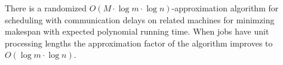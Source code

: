 \begin{theorem} \label{thm:colmain}
There is a randomized $O(M \cdot \log m \cdot \log n)$-approximation algorithm for 
scheduling with communication delays on related machines for minimzing makespan
with expected polynomial running time. When jobs have unit processing lengths the approximation factor of the algorithm improves to  $O(\log m \cdot \log n)$.
\end{theorem}



